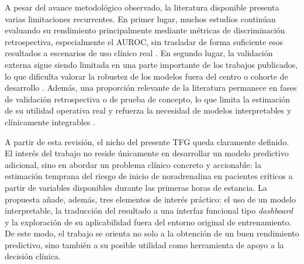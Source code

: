 A pesar del avance metodológico observado, la literatura disponible presenta varias limitaciones recurrentes. En primer lugar, muchos estudios continúan evaluando su rendimiento principalmente mediante métricas de discriminación retrospectiva, especialmente el AUROC, sin trasladar de forma suficiente esos resultados a escenarios de uso clínico real \cite{shanmugam2025}. En segundo lugar, la validación externa sigue siendo limitada en una parte importante de los trabajos publicados, lo que dificulta valorar la robustez de los modelos fuera del centro o cohorte de desarrollo \cite{rockenschaub2025}. Además, una proporción relevante de la literatura permanece en fases de validación retrospectiva o de prueba de concepto, lo que limita la estimación de su utilidad operativa real y refuerza la necesidad de modelos interpretables y clínicamente integrables \cite{shanmugam2025,rockenschaub2025}.

A partir de esta revisión, el nicho del presente TFG queda claramente definido. El interés del trabajo no reside únicamente en desarrollar un modelo predictivo adicional, sino en abordar un problema clínico concreto y accionable: la estimación temprana del riesgo de inicio de noradrenalina en pacientes críticos a partir de variables disponibles durante las primeras horas de estancia. La propuesta añade, además, tres elementos de interés práctico: el uso de un modelo interpretable, la traducción del resultado a una interfaz funcional tipo \textit{dashboard} y la exploración de su aplicabilidad fuera del entorno original de entrenamiento. De este modo, el trabajo se orienta no solo a la obtención de un buen rendimiento predictivo, sino también a su posible utilidad como herramienta de apoyo a la decisión clínica.